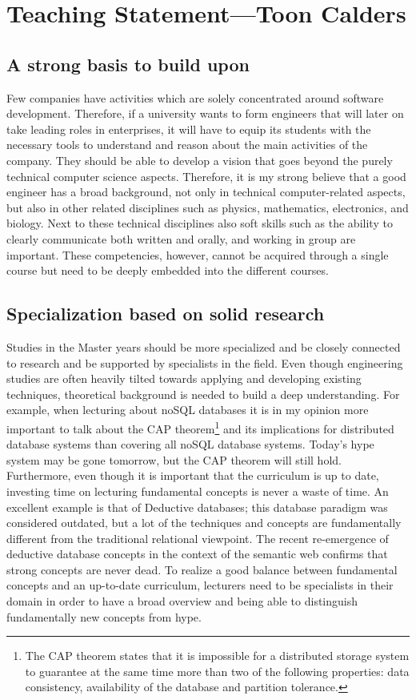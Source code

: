 \documentclass[a4paper]{article}
\begin{document}
\section*{Teaching Statement---Toon Calders}

\subsection*{A strong basis to build upon}
Few companies have activities which are solely concentrated around software development. Therefore, if a university wants to form engineers that will later on take leading roles in enterprises, it will have to equip its students with the necessary tools to understand and reason about the main activities of the company. They should be able to develop a vision that goes beyond the purely technical computer science aspects. Therefore, it is my strong believe that a good engineer has a broad background, not only in technical computer-related aspects, but also in other related disciplines such as physics, mathematics, electronics, and biology. Next to these technical disciplines also soft skills such as the ability to clearly communicate both written and orally, and working in group are important. These competencies, however, cannot be acquired through a single course but need to be deeply embedded into the different courses.

\subsection*{Specialization based on solid research}
Studies in the Master years should be more specialized and be closely connected to research and be supported by specialists in the field. Even though engineering studies are often heavily tilted towards applying and developing existing techniques, theoretical background is needed to build a deep understanding. For example, when lecturing about noSQL databases it is in my opinion more important to talk about the CAP theorem\footnote{The CAP theorem states that it is impossible for a distributed storage system to guarantee at the same time more than two of the following properties: data consistency, availability of the database and partition tolerance.} and its implications for distributed database systems than covering all noSQL database systems. Today's hype system may be gone tomorrow, but the CAP theorem will still hold. Furthermore, even though it is important that the curriculum is up to date, investing time on lecturing fundamental concepts is never a waste of time. An excellent example is that of Deductive databases; this database paradigm was considered outdated, but a lot of the techniques and concepts are fundamentally different from the traditional relational viewpoint. The recent re-emergence of deductive database concepts in the context of the semantic web confirms that strong concepts are never dead. To realize a good balance between fundamental concepts and an up-to-date curriculum, lecturers need to be specialists in their domain in order to have a broad overview and being able to distinguish fundamentally new concepts from hype.
\end{document}
